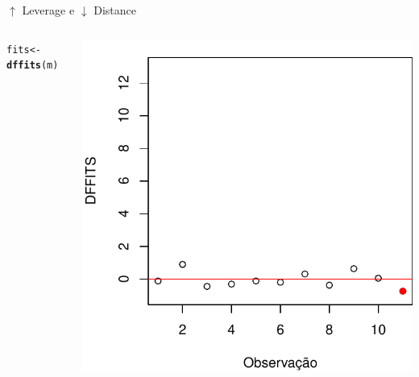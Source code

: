 \documentclass{beamer}\usepackage[]{graphicx}\usepackage[]{color}
\makeatletter
\newcommand{\hlstd}[1]{\textcolor[rgb]{0.345,0.345,0.345}{#1}}%
\newcommand{\hlkwb}[1]{\textcolor[rgb]{0.69,0.353,0.396}{#1}}%
\newcommand{\hlkwd}[1]{\textcolor[rgb]{0.737,0.353,0.396}{\textbf{#1}}}%
\newenvironment{kframe}{%
 \def\at@end@of@kframe{}%
 \ifinner\ifhmode%
  \def\at@end@of@kframe{\end{minipage}}%
  \begin{minipage}{\columnwidth}%
 \fi\fi%
 \def\FrameCommand##1{\hskip\@totalleftmargin \hskip-\fboxsep
 \colorbox{shadecolor}{##1}\hskip-\fboxsep
     \hskip-\linewidth \hskip-\@totalleftmargin \hskip\columnwidth}%
 \MakeFramed {\advance\hsize-\width
   \@totalleftmargin\z@ \linewidth\hsize
   \@setminipage}}%
 {\par\unskip\endMakeFramed%
 \at@end@of@kframe}
\newenvironment{knitrout}{}{} %
\renewenvironment{knitrout}{\setlength{\topsep}{0mm}}{}
\makeatother
\begin{document}
\begin{frame}{$\uparrow$ Leverage e $\downarrow$ Distance}
\begin{columns}[c]
\begin{knitrout}\tiny
{}\color{fgcolor}\begin{kframe}
\begin{alltt}
\hlstd{fits} \hlkwb{<-} \hlkwd{dffits}\hlstd{(m)}
\end{alltt}
\end{kframe}
\includegraphics[width=1\linewidth]{figure/inf10-1} 

\end{knitrout}

\end{columns}
\end{frame}
\end{document}
